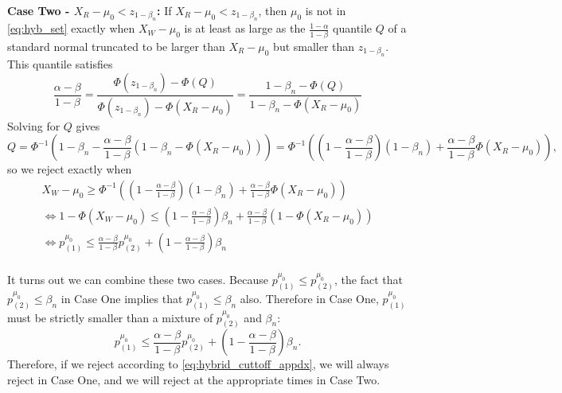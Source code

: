 \documentclass{article}
\begin{document}
\begin{appendix}
\noindent \textbf{Case Two - $X_R - \mu_0 < z_{1 - \beta_n}$:} If $X_R - \mu_0 < z_{1 - \beta_n}$, then $\mu_0$ is not in \eqref{eq:hyb_set} exactly when $X_W - \mu_0$ is at least as large as the $\frac{1-\alpha}{1-\beta}$ quantile $Q$ of a standard normal truncated to be larger than $X_{R} - \mu_0$ but smaller than $z_{1- \beta_n}$. This quantile satisfies 
\begin{equation*}
    \frac{\alpha - \beta}{1- \beta} = \frac{\Phi(z_{1 - \beta_n})  - \Phi(Q) }{\Phi(z_{1-\beta_n})  - \Phi(X_R - \mu_0) } = \frac{1 - \beta_n  - \Phi(Q) }{1 - \beta_n - \Phi(X_R - \mu_0) } 
\end{equation*}
Solving for $Q$ gives 
\begin{equation*}
    Q = \Phi^{-1} \left(1 - \beta_n - \frac{\alpha - \beta}{1 - \beta}\left(1 - \beta_n - \Phi(X_{R} - \mu_0) \right) \right) = \Phi^{-1} \left( \left(1 - \frac{\alpha - \beta}{1 - \beta}\right) (1 - \beta_n) + \frac{\alpha-\beta}{1-\beta}\Phi(X_{R} - \mu_0) \right),
\end{equation*}
so we reject exactly when 
\begin{align*}
        X_{W} - \mu_0 \geq \Phi^{-1} \left( \left(1 - \frac{\alpha - \beta}{1 - \beta}\right) (1- \beta_n) + \frac{\alpha-\beta}{1-\beta}\Phi(X_{R} - \mu_0) \right) \\
        \iff 1 -\Phi(X_{W} - \mu_0) \leq \left(1 - \frac{\alpha - \beta}{1 - \beta}\right)\beta_n + \frac{\alpha-\beta}{1-\beta}(1-\Phi(X_{R} - \mu_0))  \\
        \iff p^{\mu_0}_{(1)} \leq \frac{\alpha-\beta}{1-\beta}p^{\mu_0}_{(2)}  + \left(1 - \frac{\alpha - \beta}{1 - \beta}\right)\beta_n \\
\end{align*}

It turns out we can combine these two cases. Because $p^{\mu_0}_{(1)} \leq p^{\mu_0}_{(2)}$, the fact that $p^{\mu_0}_{(2)} \leq  \beta_n$ in Case One implies that $p^{\mu_0}_{(1)} \leq \beta_n$ also. Therefore in Case One, $p^{\mu_0}_{(1)}$ must be strictly smaller than a mixture of $p^{\mu_0}_{(2)}$ and $\beta_n$:
\begin{equation}
    \label{eq:hybrid_cuttoff_appdx}
    p^{\mu_0}_{(1)} \leq  \frac{\alpha-\beta}{1-\beta}p^{\mu_0}_{(2)}  + \left(1 - \frac{\alpha - \beta}{1 - \beta}\right)\beta_n. 
\end{equation}
Therefore, if we reject according to \eqref{eq:hybrid_cuttoff_appdx}, we will always reject in Case One, and we will reject at the appropriate times in Case Two. 


\end{appendix}
\end{document}
